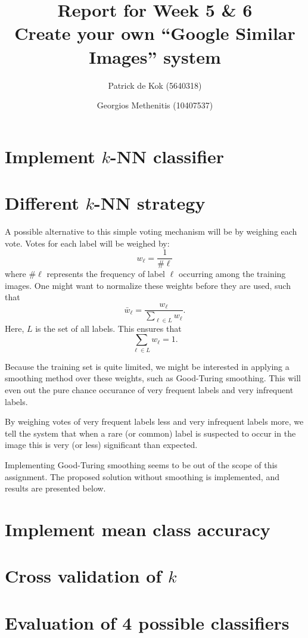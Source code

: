 \documentclass[a4paper,10pt,twoside]{article}
\title{Report for Week 5 \& 6\\\normalsize Create your own ``Google Similar Images'' system}
\author{Patrick de Kok (5640318) \and Georgios Methenitis (10407537)}
\begin{document}
\maketitle
\thispagestyle{empty}

\section{Implement $k$-NN classifier}

\section{Different $k$-NN strategy}
A possible alternative to this simple voting mechanism will be by weighing each vote.  Votes for each label will be weighed by: \[ w_\ell = \frac{1}{\#\ell} \] where $\#\ell$ represents the frequency of label $\ell$ occurring among the training images.  One might want to normalize these weights before they are used, such that \[\bar w_\ell = \frac{w_\ell}{\sum_{\ell \in L} w_\ell} .\] Here, $L$ is the set of all labels.  This ensures that \[\sum_{\ell \in L} w_\ell = 1.\]

Because the training set is quite limited, we might be interested in applying a smoothing method over these weights, such as Good-Turing smoothing.  This will even out the pure chance occurance of very frequent labels and very infrequent labels.  

By weighing votes of very frequent labels less and very infrequent labels more, we tell the system that when a rare (or common) label is suspected to occur in the image this is very (or less) significant than expected.

Implementing Good-Turing smoothing seems to be out of the scope of this assignment.  The proposed solution without smoothing is implemented, and results are presented below.  %

\section{Implement mean class accuracy}

\section{Cross validation of $k$}

\section{Evaluation of 4 possible classifiers}
\end{document}

